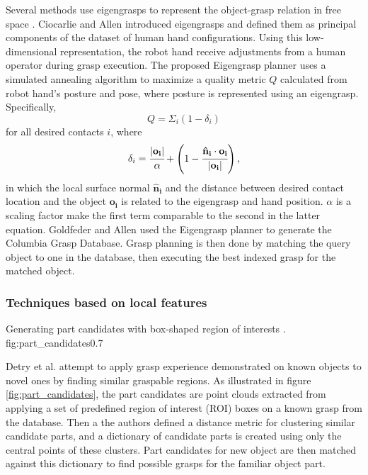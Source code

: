 Several methods use eigengrasps to represent the object-grasp relation in free space \cite{Goldfeder2011,Ciocarlie2009}.
Ciocarlie and Allen \cite{Ciocarlie2009} introduced eigengrasps and defined them as principal components of the dataset
of human hand configurations. Using this low-dimensional representation, the robot hand receive adjustments from a human
operator during grasp execution. The proposed Eigengrasp planner uses a simulated annealing algorithm to maximize a
quality metric $Q$ calculated from robot hand's posture and pose, where posture is represented using an eigengrasp.
Specifically,
\[ Q = \Sigma_i (1 - \delta_i) \]
for all desired contacts $i$, where
\[ \delta_i = \cfrac{|\mathbf{o_i}|}{\alpha}
              + \left(1 - \cfrac{\mathbf{\hat{n}_i} \cdot \mathbf{o_i}}{|\mathbf{o_i}|} \right), \]
in which the local surface normal $\mathbf{\hat{n}_i}$ and the distance between desired contact location and the
object $\mathbf{o_i}$ is related to the eigengrasp and hand position. $\alpha$ is a scaling factor make the first term
comparable to the second in the latter equation. Goldfeder and Allen \cite{Goldfeder2011} used the Eigengrasp planner
to generate the Columbia Grasp Database. Grasp planning is then done by matching the query object to one in the
database, then executing the best indexed grasp for the matched object.


\subsubsection*{Techniques based on local features} \label{subsub:object_grasp_local}

{Generating part candidates with box-shaped region of interests \cite{Detry2012}.}
{fig:part_candidates}{0.7\textwidth}

Detry et al. \cite{Detry2012} attempt to apply grasp experience demonstrated on known objects to novel ones by finding
similar graspable regions. As illustrated in figure \ref{fig:part_candidates}, the part candidates are point clouds
extracted from applying a set of predefined region of interest (ROI) boxes on a known grasp from the database. Then a
the authors defined a distance metric for clustering similar candidate parts, and a dictionary of candidate parts is
created using only the central points of these clusters. Part candidates for new object are then matched against this
dictionary to find possible grasps for the familiar object part.

